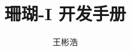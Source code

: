 \documentclass{thesis-uestc}
\title{珊瑚-I 开发手册}{aCoral-I Development Manual}
\author{王彬浩}{Wang BinHao}
\begin{document}
\makecover





\thesistableofcontents


\end{document}
